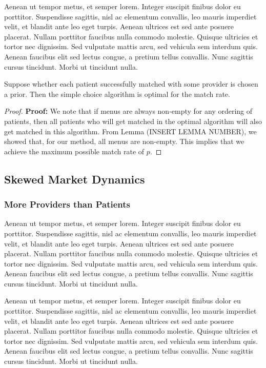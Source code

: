  Aenean ut tempor metus, et semper lorem. Integer suscipit finibus dolor eu porttitor. Suspendisse sagittis, nisl ac elementum convallis, leo mauris imperdiet velit, et blandit ante leo eget turpis. Aenean ultrices est sed ante posuere placerat. Nullam porttitor faucibus nulla commodo molestie. Quisque ultricies et tortor nec dignissim. Sed vulputate mattis arcu, sed vehicula sem interdum quis. Aenean faucibus elit sed lectus congue, a pretium tellus convallis. Nunc sagittis cursus tincidunt. Morbi ut tincidunt nulla.
\begin{corollary}
    Suppose whether each patient successfully matched with some provider is chosen a prior. Then the simple choice algorithm is optimal for the match rate. 
\end{corollary}
\begin{proof}
    \textbf{Proof:} We note that if menus are always non-empty for any ordering of patients, then all patients who will get matched in the optimal algorithm will also get matched in this algorithm. 
    From Lemma (INSERT LEMMA NUMBER), we showed that, for our method, all menus are non-empty. 
    This implies that we achieve the maximum possible match rate of $p$. 
\end{proof}

\subsection{Skewed Market Dynamics}
\subsubsection{More Providers than Patients}
 Aenean ut tempor metus, et semper lorem. Integer suscipit finibus dolor eu porttitor. Suspendisse sagittis, nisl ac elementum convallis, leo mauris imperdiet velit, et blandit ante leo eget turpis. Aenean ultrices est sed ante posuere placerat. Nullam porttitor faucibus nulla commodo molestie. Quisque ultricies et tortor nec dignissim. Sed vulputate mattis arcu, sed vehicula sem interdum quis. Aenean faucibus elit sed lectus congue, a pretium tellus convallis. Nunc sagittis cursus tincidunt. Morbi ut tincidunt nulla.

 Aenean ut tempor metus, et semper lorem. Integer suscipit finibus dolor eu porttitor. Suspendisse sagittis, nisl ac elementum convallis, leo mauris imperdiet velit, et blandit ante leo eget turpis. Aenean ultrices est sed ante posuere placerat. Nullam porttitor faucibus nulla commodo molestie. Quisque ultricies et tortor nec dignissim. Sed vulputate mattis arcu, sed vehicula sem interdum quis. Aenean faucibus elit sed lectus congue, a pretium tellus convallis. Nunc sagittis cursus tincidunt. Morbi ut tincidunt nulla.

